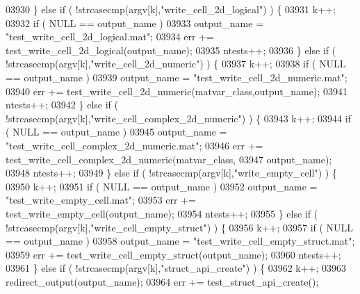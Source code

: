 \begin{DoxyCode}
{{{{{{{{{{{{{{{{{{{{{{{{{{{{{{{{{{{{{{{{{{{{{{{{{{{{{{{{{{{{{{{{{{{{03930         \} \textcolor{keywordflow}{else} \textcolor{keywordflow}{if} ( !strcasecmp(argv[k],\textcolor{stringliteral}{"write\_cell\_2d\_logical"}) ) \{
03931             k++;
03932             \textcolor{keywordflow}{if} ( NULL == output\_name )
03933                 output\_name = \textcolor{stringliteral}{"test\_write\_cell\_2d\_logical.mat"};
03934             err += test\_write\_cell\_2d\_logical(output\_name);
03935             ntests++;
03936         \} \textcolor{keywordflow}{else} \textcolor{keywordflow}{if} ( !strcasecmp(argv[k],\textcolor{stringliteral}{"write\_cell\_2d\_numeric"}) ) \{
03937             k++;
03938             \textcolor{keywordflow}{if} ( NULL == output\_name )
03939                 output\_name = \textcolor{stringliteral}{"test\_write\_cell\_2d\_numeric.mat"};
03940             err += test\_write\_cell\_2d\_numeric(matvar\_class,output\_name);
03941             ntests++;
03942         \} \textcolor{keywordflow}{else} \textcolor{keywordflow}{if} ( !strcasecmp(argv[k],\textcolor{stringliteral}{"write\_cell\_complex\_2d\_numeric"}) ) \{
03943             k++;
03944             \textcolor{keywordflow}{if} ( NULL == output\_name )
03945                 output\_name = \textcolor{stringliteral}{"test\_write\_cell\_complex\_2d\_numeric.mat"};
03946             err += test\_write\_cell\_complex\_2d\_numeric(matvar\_class,
03947                                                         output\_name);
03948             ntests++;
03949         \} \textcolor{keywordflow}{else} \textcolor{keywordflow}{if} ( !strcasecmp(argv[k],\textcolor{stringliteral}{"write\_empty\_cell"}) ) \{
03950             k++;
03951             \textcolor{keywordflow}{if} ( NULL == output\_name )
03952                 output\_name = \textcolor{stringliteral}{"test\_write\_empty\_cell.mat"};
03953             err += test\_write\_empty\_cell(output\_name);
03954             ntests++;
03955         \} \textcolor{keywordflow}{else} \textcolor{keywordflow}{if} ( !strcasecmp(argv[k],\textcolor{stringliteral}{"write\_cell\_empty\_struct"}) ) \{
03956             k++;
03957             \textcolor{keywordflow}{if} ( NULL == output\_name )
03958                 output\_name = \textcolor{stringliteral}{"test\_write\_cell\_empty\_struct.mat"};
03959             err += test\_write\_cell\_empty\_struct(output\_name);
03960             ntests++;
03961         \} \textcolor{keywordflow}{else} \textcolor{keywordflow}{if} ( !strcasecmp(argv[k],\textcolor{stringliteral}{"struct\_api\_create"}) ) \{
03962             k++;
03963             redirect\_output(output\_name);
03964             err += test\_struct\_api\_create();
}}}}}}}}}}}}}}}}}}}}}}}}}}}}}}}}}}}}}}}}}}}}}}}}}}}}}}}}}}}}}}}}}}}}
\end{DoxyCode}
